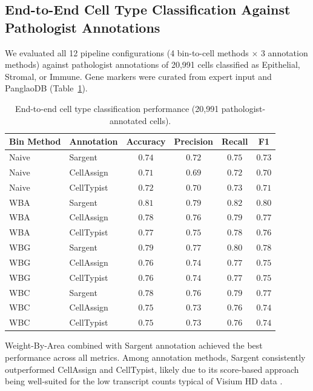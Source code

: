 \documentclass[11pt]{article}
\begin{document}
\subsection{End-to-End Cell Type Classification Against Pathologist Annotations}

We evaluated all 12 pipeline configurations (4 bin-to-cell methods $\times$ 3 annotation methods) against pathologist annotations of 20,991 cells classified as Epithelial, Stromal, or Immune. Gene markers were curated from expert input and PanglaoDB \citep{franzen2019panglaodb} (Table~\ref{tab:end2end}).

\begin{table}[H]
\centering
\caption{End-to-end cell type classification performance (20,991 pathologist-annotated cells).}
\label{tab:end2end}
\begin{tabular}{llcccc}
\toprule
\textbf{Bin Method} & \textbf{Annotation} & \textbf{Accuracy} & \textbf{Precision} & \textbf{Recall} & \textbf{F1} \\
\midrule
Naive & Sargent & $0.74$ & $0.72$ & $0.75$ & $0.73$ \\
Naive & CellAssign & $0.71$ & $0.69$ & $0.72$ & $0.70$ \\
Naive & CellTypist & $0.72$ & $0.70$ & $0.73$ & $0.71$ \\
WBA & Sargent & $\mathbf{0.81}$ & $\mathbf{0.79}$ & $\mathbf{0.82}$ & $\mathbf{0.80}$ \\
WBA & CellAssign & $0.78$ & $0.76$ & $0.79$ & $0.77$ \\
WBA & CellTypist & $0.77$ & $0.75$ & $0.78$ & $0.76$ \\
WBG & Sargent & $0.79$ & $0.77$ & $0.80$ & $0.78$ \\
WBG & CellAssign & $0.76$ & $0.74$ & $0.77$ & $0.75$ \\
WBG & CellTypist & $0.76$ & $0.74$ & $0.77$ & $0.75$ \\
WBC & Sargent & $0.78$ & $0.76$ & $0.79$ & $0.77$ \\
WBC & CellAssign & $0.75$ & $0.73$ & $0.76$ & $0.74$ \\
WBC & CellTypist & $0.75$ & $0.73$ & $0.76$ & $0.74$ \\
\bottomrule
\end{tabular}
\end{table}

Weight-By-Area combined with Sargent annotation achieved the best performance across all metrics. Among annotation methods, Sargent consistently outperformed CellAssign and CellTypist, likely due to its score-based approach being well-suited for the low transcript counts typical of Visium HD data \citep{sargent2023annotation}.
\end{document}
